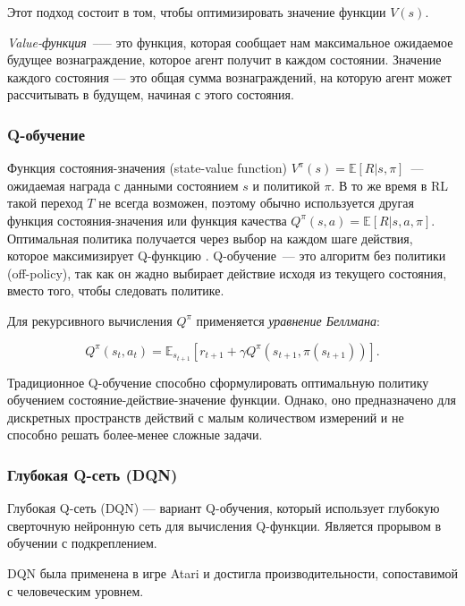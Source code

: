Этот подход состоит в том, чтобы оптимизировать значение функции $V(s)$.

\textit{Value-функция}~--— это функция, которая сообщает нам максимальное ожидаемое будущее вознаграждение, которое агент получит в каждом состоянии. Значение каждого состояния — это общая сумма вознаграждений, на которую агент может рассчитывать в будущем, начиная с этого состояния.

\subsubsection{Q-обучение}

Функция состояния-значения (state-value function) $V^\pi (s) = \mathbb{E}[R|s, \pi]$~--- ожидаемая награда с данными состоянием $s$ и политикой $\pi$. В то же время в RL такой переход $T$ не всегда возможен, поэтому обычно используется другая функция состояния-значения или функция качества ${Q^\pi(s,a) = \mathbb{E}[R|s, a, \pi]}$. Оптимальная политика получается через выбор на каждом шаге действия, которое максимизирует Q-функцию \cite{SuttonAndBarto-RL-Introduction-p107}. Q-обучение~--- это алгоритм без политики (off-policy), так как он жадно выбирает действие исходя из текущего состояния, вместо того, чтобы следовать политике.

Для рекурсивного вычисления $Q^\pi$ применяется {\itshape уравнение Беллмана}:

\begin{equation}
    \label{eq:q-learning-bellmanEq}
    Q^\pi(s_t, a_t) = \mathbb{E}_{s_{t+1}}[r_{t+1} + \gamma Q^\pi (s_{t+1}, \pi(s_{t+1}))].
\end{equation}

Традиционное Q-обучение способно сформулировать оптимальную политику обучением состояние-действие-значение функции. Однако, оно предназначено для дискретных пространств действий с малым количеством измерений и не способно решать более-менее сложные задачи.

\subsubsection{Глубокая Q-сеть (DQN)}

Глубокая Q-сеть (DQN) --- вариант Q-обучения, который использует глубокую сверточную нейронную сеть для вычисления Q-функции. Является прорывом в обучении с подкреплением. \cite{bertsekas1996neuro}

DQN была применена в игре Atari и достигла производительности, сопоставимой с человеческим уровнем. \cite{Mnih2015}


